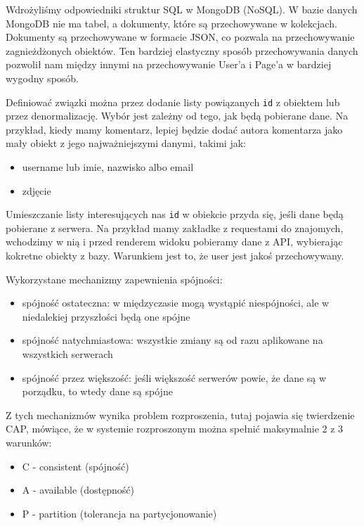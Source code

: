 \documentclass{article}
\begin{document}
Wdrożyliśmy odpowiedniki struktur SQL w MongoDB (NoSQL). W bazie danych MongoDB nie ma tabel, a dokumenty, które są przechowywane w kolekcjach. Dokumenty są przechowywane w formacie JSON, co pozwala na przechowywanie zagnieżdżonych obiektów. Ten bardziej elastyczny sposób przechowywania danych pozwolił nam między innymi na przechowywanie User'a i Page'a w bardziej wygodny sposób.

Definiować związki można przez dodanie listy powiązanych \texttt{id} z obiektem lub przez denormalizację. Wybór jest zależny od tego, jak będą pobierane dane. Na przykład, kiedy mamy komentarz, lepiej będzie dodać autora komentarza jako mały obiekt z jego najważniejszymi danymi, takimi jak:

\begin{itemize}
    \item username lub imie, nazwisko albo email
    \item zdjęcie
\end{itemize}

Umieszczanie listy interesujących nas \texttt{id} w obiekcie przyda się, jeśli dane będą pobierane z serwera. Na przykład mamy zakładke z requestami do znajomych, wchodzimy w nią i przed renderem widoku pobieramy dane z API, wybierając kokretne obiekty z bazy. Warunkiem jest to, że user jest jakoś przechowywany.

Wykorzystane mechanizmy zapewnienia spójności:
\begin{itemize}
    \item spójność ostateczna: w międzyczasie mogą wystąpić niespójności, ale w niedalekiej przyszłości będą one spójne
    \item spójność natychmiastowa: wszystkie zmiany są od razu aplikowane na wszystkich serwerach
    \item spójność przez większość: jeśli większość serwerów powie, że dane są w porządku, to wtedy dane są spójne
\end{itemize}

Z tych mechanizmów wynika problem rozproszenia, tutaj pojawia się twierdzenie CAP, mówiące, że w systemie rozproszonym można spełnić maksymalnie 2 z 3 warunków:

\begin{itemize}
    \item C - consistent (spójność)
    \item A - available (dostępność)
    \item P - partition (tolerancja na partycjonowanie)
\end{itemize}
\end{document}
